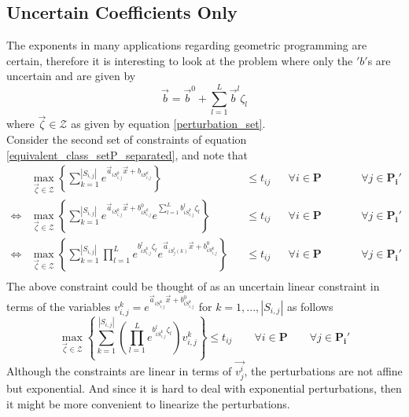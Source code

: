 \subsection{Uncertain Coefficients Only}
The exponents in many applications regarding geometric programming are certain, therefore it is interesting to look at the problem where only the $'b'$s are uncertain and are given by
$$
\vec{b} = \vec{b}^0 + \textstyle{\sum}_{l=1}^{L}\vec{b}^l\zeta_l
$$
where $\vec{\zeta} \in \mathcal{Z}$ as given by equation \eqref{perturbation_set}.\\
Consider the second set of constraints of equation \eqref{equivalent_class_setP_separated}, and note that
$$
\begin{aligned}
&\max_{\vec{\zeta} \in \mathcal{Z}} \left\{\textstyle{\sum}_{k=1}^{|S_{i,j}|} e^{\vec{a}_{iS_{i,j}^k}\vec{x} + b_{iS_{i,j}^k}} \right\} &&\leq t_{ij} &&\forall i \in \mathbf{P} \qquad &&\forall j \in \mathbf{P_i'}\\
\Leftrightarrow &\max_{\vec{\zeta} \in \mathcal{Z}} \left\{\textstyle{\sum}_{k=1}^{|S_{i,j}|} e^{\vec{a}_{iS_{i,j}^k}\vec{x} + b^0_{iS_{i,j}^k}}e^{\textstyle{\sum}_{l=1}^{L}b^l_{iS_{i,j}^k}\zeta_l} \right\} &&\leq t_{ij} &&\forall i \in \mathbf{P} \qquad &&\forall j \in \mathbf{P_i'}\\
\Leftrightarrow &\max_{\vec{\zeta} \in \mathcal{Z}} \left\{\textstyle{\sum}_{k=1}^{|S_{i,j}|}\textstyle{\prod}_{l=1}^{L}e^{b^l_{iS_{i,j}^k}\zeta_l} e^{\vec{a}_{iS_j^i(k)}\vec{x} + b^0_{iS_{i,j}^k}} \right\} &&\leq t_{ij} &&\forall i \in \mathbf{P} \qquad &&\forall j \in \mathbf{P_i'}\\
\end{aligned}
$$
The above constraint could be thought of as an uncertain linear constraint in terms of the variables $v_{i,j}^k = e^{\vec{a}_{iS_{i,j}^k}\vec{x} + b^0_{iS_{i,j}^k}}$ for $k = 1,...,|S_{i,j}|$ as follows
\begin{equation}
\max_{\vec{\zeta} \in \mathcal{Z}} \left\{\textstyle{\sum}_{k=1}^{|S_{i,j}|}\left(\textstyle{\prod}_{l=1}^{L}e^{b^l_{iS_{i,j}^k}\zeta_l}\right) v_{i,j}^k \right\} \leq t_{ij} \qquad \forall i \in \mathbf{P} \qquad \forall j \in \mathbf{P_i'}
\label{linearCon_expPerts}
\end{equation}
Although the constraints are linear in terms of $\vec{v_j^i}$, the perturbations are not affine but exponential. And since it is hard to deal with exponential perturbations, then it might be more convenient to linearize the perturbations.

